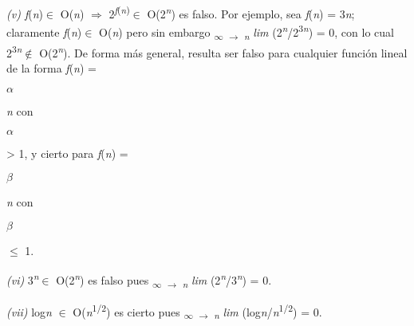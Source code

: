 \documentclass[12pt]{article}
\renewcommand{\_}{\kern-1.5pt\textunderscore\kern-1.5pt}
\begin{document}
\begin{adjustwidth}{0.58in}{0.57in}
\begin{justify}
{\fontsize{10pt}{12.0pt}\selectfont \textit{(v) f}(\textit{n})$ \in $ O(\textit{n}) $ \Rightarrow $  2\textit{\textsuperscript{f}}\textsuperscript{(\textit{n})}$ \in $ O(2\textit{\textsuperscript{n}}) es falso. Por ejemplo, sea \textit{f}(\textit{n}) = 3\textit{n}; claramente \textit{f}(\textit{n})$ \in $ O(\textit{n}) pero sin embargo \textsubscript{$\infty$ $ \rightarrow $ \textit{n }}\textit{lim }(2\textit{\textsuperscript{n}}/2\textsuperscript{3\textit{n}}) = 0, con lo cual 2\textsuperscript{3\textit{n}}$ \notin $ O(2\textit{\textsuperscript{n}}). De forma más general, resulta ser falso para cualquier función lineal de la forma \textit{f}(\textit{n}) = {\fontsize{11pt}{13.2pt}\selectfont $ \alpha $ {\fontsize{10pt}{12.0pt}\selectfont \textit{n }con {\fontsize{11pt}{13.2pt}\selectfont $ \alpha $  {\fontsize{10pt}{12.0pt}\selectfont > 1, y cierto para \textit{f}(\textit{n}) = {\fontsize{11pt}{13.2pt}\selectfont $ \beta $ {\fontsize{10pt}{12.0pt}\selectfont \textit{n }con {\fontsize{11pt}{13.2pt}\selectfont $ \beta $  {\fontsize{10pt}{12.0pt}\selectfont $ \leq $  1. \par}\par}\par}\par}\par}\par}\par}\par}\par}
\end{justify}\par

\end{adjustwidth}

\begin{adjustwidth}{0.58in}{2.71in}
{\fontsize{10pt}{12.0pt}\selectfont \textit{(vi) }3\textit{\textsuperscript{n}}$ \in $ O(2\textit{\textsuperscript{n}}) es falso pues \textsubscript{$\infty$ $ \rightarrow $ \textit{n }}\textit{lim }(2\textit{\textsuperscript{n}}/3\textit{\textsuperscript{n}}) = 0. \par}\par

\end{adjustwidth}

\begin{adjustwidth}{0.58in}{2.17in}
{\fontsize{10pt}{12.0pt}\selectfont \textit{(vii) }log\textit{n }$ \in $ O(\textit{n}\textsuperscript{1/2}) es cierto pues \textsubscript{$\infty$ $ \rightarrow $ \textit{n }}\textit{lim }(log\textit{n}/\textit{n}\textsuperscript{1/2}) = 0. \par}\par

\end{adjustwidth}
\end{document}
